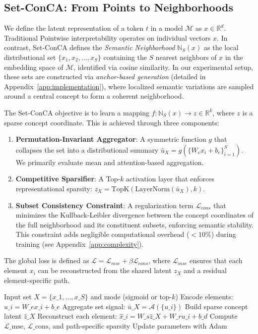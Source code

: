 \documentclass{article}
\begin{document}
\subsection{Set-ConCA: From Points to Neighborhoods}

We define the latent representation of a token $t$ in a model $\mathcal{M}$ as $x \in \mathbb{R}^d$. Traditional Pointwise interpretability operates on individual vectors $x$. In contrast, Set-ConCA defines the \textit{Semantic Neighborhood} $\mathbb{N}_S(x)$ as the local distributional set $\{x_1, x_2, \dots, x_S\}$ containing the $S$ nearest neighbors of $x$ in the embedding space of $\mathcal{M}$, identified via cosine similarity. In our experimental setup, these sets are constructed via \textit{anchor-based generation} (detailed in Appendix~\ref{app:implementation}), where localized semantic variations are sampled around a central concept to form a coherent neighborhood.

The Set-ConCA objective is to learn a mapping $f: \mathbb{N}_S(x) \rightarrow z \in \mathbb{R}^k$, where $z$ is a sparse concept coordinate. This is achieved through three components:
\begin{enumerate}
    \item \textbf{Permutation-Invariant Aggregator}: A symmetric function $g$ that collapses the set into a distributional summary $\bar u_X = g(\{W_e x_i + b_e\}_{i=1}^S)$. We primarily evaluate mean and attention-based aggregation.
    \item \textbf{Competitive Sparsifier}: A Top-$k$ activation layer that enforces representational sparsity: $z_X = \mathrm{TopK}(\mathrm{LayerNorm}(\bar u_X), k)$.
    \item \textbf{Subset Consistency Constraint}: A regularization term $\mathcal{L}_{cons}$ that minimizes the Kullback-Leibler divergence between the concept coordinates of the full neighborhood and its constituent subsets, enforcing semantic stability. This constraint adds negligible computational overhead ($<10\%$) during training (see Appendix~\ref{app:complexity}).
\end{enumerate}

The global loss is defined as $\mathcal{L} = \mathcal{L}_{mse} + \beta \mathcal{L}_{cons}$, where $\mathcal{L}_{mse}$ ensures that each element $x_i$ can be reconstructed from the shared latent $z_X$ and a residual element-specific path.

\begin{algorithm}[t]
\caption{Set-ConCA training step}
\label{alg:setconca}
\begin{algorithmic}[1]
\STATE Input set $X=\{x\_1,\dots,x\_S\}$ and mode (sigmoid or top-$k$)
\STATE Encode elements: $u\_i=W\_ex\_i+b\_e$
\STATE Aggregate set signal: $\bar u\_X=\mathcal{A}(\{u\_i\})$
\STATE Build sparse concept latent $\hat z\_X$
\STATE Reconstruct each element: $\hat x\_i=W\_s\hat z\_X+W\_ru\_i+b\_d$
\STATE Compute $\mathcal{L}\_{\mathrm{mse}}$, $\mathcal{L}\_{\mathrm{cons}}$, and path-specific sparsity
\STATE Update parameters with Adam
\end{algorithmic}
\end{algorithm}
\end{document}
